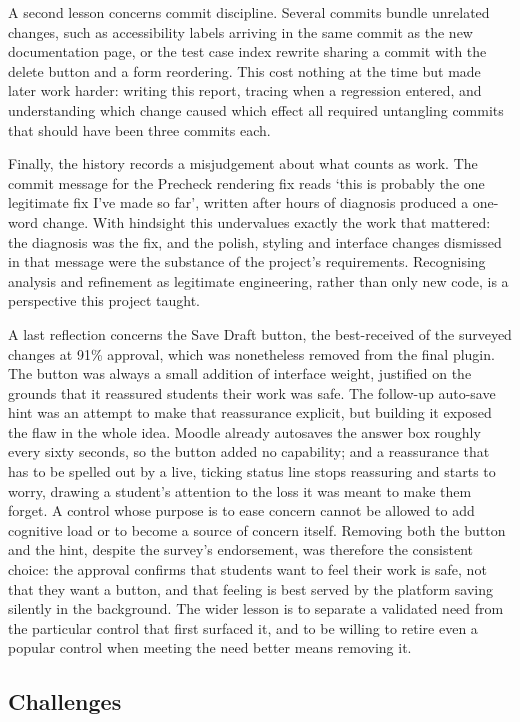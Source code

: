 A second lesson concerns commit discipline. Several commits bundle unrelated changes, such as accessibility labels arriving in the same commit as the new documentation page, or the test case index rewrite sharing a commit with the delete button and a form reordering. This cost nothing at the time but made later work harder: writing this report, tracing when a regression entered, and understanding which change caused which effect all required untangling commits that should have been three commits each.

Finally, the history records a misjudgement about what counts as work. The commit message for the Precheck rendering fix reads `this is probably the one legitimate fix I've made so far', written after hours of diagnosis produced a one-word change. With hindsight this undervalues exactly the work that mattered: the diagnosis was the fix, and the polish, styling and interface changes dismissed in that message were the substance of the project's requirements. Recognising analysis and refinement as legitimate engineering, rather than only new code, is a perspective this project taught.

A last reflection concerns the Save Draft button, the best-received of the surveyed changes at 91\% approval, which was nonetheless removed from the final plugin. The button was always a small addition of interface weight, justified on the grounds that it reassured students their work was safe. The follow-up auto-save hint was an attempt to make that reassurance explicit, but building it exposed the flaw in the whole idea. Moodle already autosaves the answer box roughly every sixty seconds, so the button added no capability; and a reassurance that has to be spelled out by a live, ticking status line stops reassuring and starts to worry, drawing a student's attention to the loss it was meant to make them forget. A control whose purpose is to ease concern cannot be allowed to add cognitive load or to become a source of concern itself. Removing both the button and the hint, despite the survey's endorsement, was therefore the consistent choice: the approval confirms that students want to feel their work is safe, not that they want a button, and that feeling is best served by the platform saving silently in the background. The wider lesson is to separate a validated need from the particular control that first surfaced it, and to be willing to retire even a popular control when meeting the need better means removing it.

\subsection{Challenges}

